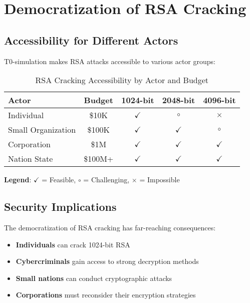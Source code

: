 \documentclass[12pt,a4paper]{article}
\begin{document}
	\section{Democratization of RSA Cracking}
	
	\subsection{Accessibility for Different Actors}
	
	T0-simulation makes RSA attacks accessible to various actor groups:
	
	\begin{table}[htbp]
		\centering
		\begin{tabular}{lcccc}
			\toprule
			\textbf{Actor} & \textbf{Budget} & \textbf{1024-bit} & \textbf{2048-bit} & \textbf{4096-bit} \\
			\midrule
			\rowcolor{red!30} Individual & \$10K & $\checkmark$ & $\circ$ & $\times$ \\
			\rowcolor{orange!30} Small Organization & \$100K & $\checkmark$ & $\checkmark$ & $\circ$ \\
			\rowcolor{yellow!30} Corporation & \$1M & $\checkmark$ & $\checkmark$ & $\checkmark$ \\
			\rowcolor{green!30} Nation State & \$100M+ & $\checkmark$ & $\checkmark$ & $\checkmark$ \\
			\bottomrule
		\end{tabular}
		\caption{RSA Cracking Accessibility by Actor and Budget}
		\label{tab:accessibility}
	\end{table}
	
	\textbf{Legend}: $\checkmark$ = Feasible, $\circ$ = Challenging, $\times$ = Impossible
	
	\subsection{Security Implications}
	
	The democratization of RSA cracking has far-reaching consequences:
	
	\begin{itemize}
		\item \textbf{Individuals} can crack 1024-bit RSA
		\item \textbf{Cybercriminals} gain access to strong decryption methods
		\item \textbf{Small nations} can conduct cryptographic attacks
		\item \textbf{Corporations} must reconsider their encryption strategies
	\end{itemize}
	
\end{document}
